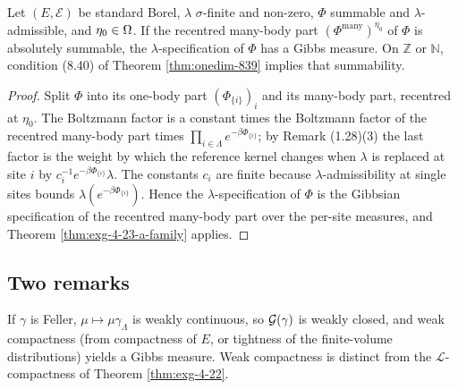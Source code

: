 \begin{corollary}
    \label{cor:exg-self-energy}
    \leanok

    Let $(E,\mathcal E)$ be standard Borel, $\lambda$ $\sigma$-finite and non-zero, $\Phi$
    summable and $\lambda$-admissible, and $\eta_0\in\Omega$. If the recentred many-body part
    $(\Phi^{\mathrm{many}})^{\eta_0}$ of $\Phi$ is absolutely summable, the
    $\lambda$-specification of $\Phi$ has a Gibbs measure. On $\mathbb Z$ or $\mathbb N$,
    condition (8.40) of Theorem \ref{thm:onedim-839} implies that summability.
\end{corollary}
\begin{proof}
    \leanok

    Split $\Phi$ into its one-body part $(\Phi_{\{i\}})_i$ and its many-body part, recentred
    at $\eta_0$. The Boltzmann factor is a constant times the Boltzmann factor of the recentred
    many-body part times $\prod_{i\in\Lambda}e^{-\beta\Phi_{\{i\}}}$; by Remark (1.28)(3) the
    last factor is the weight by which the reference kernel changes when $\lambda$ is replaced
    at site $i$ by $c_i^{-1}e^{-\beta\Phi_{\{i\}}}\lambda$. The constants $c_i$ are finite
    because $\lambda$-admissibility at single sites bounds
    $\lambda(e^{-\beta\Phi_{\{i\}}})$. Hence the $\lambda$-specification of $\Phi$ is the
    Gibbsian specification of the recentred many-body part over the per-site measures, and
    Theorem \ref{thm:exg-4-23-a-family} applies.
\end{proof}

\subsection*{Two remarks}

\begin{remark}
    \label{rmk:exg-weak-topology}
    \leanok

    If $\gamma$ is Feller, $\mu\mapsto\mu\gamma_\Lambda$ is weakly continuous, so
    $\mathcal{G}(\gamma)$ is weakly closed, and weak compactness (from compactness of $E$, or
    tightness of the finite-volume distributions) yields a Gibbs measure. Weak compactness is
    distinct from the $\mathcal L$-compactness of Theorem \ref{thm:exg-4-22}.
\end{remark}

